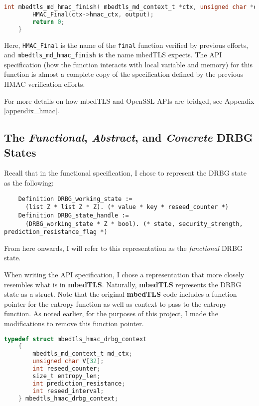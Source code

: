 \documentclass[pageno]{jpaper}
\newcommand{\stdtitle}[1]{\textbf{#1}}
\begin{document}
\begin{lstlisting}[language=C]
    int mbedtls_md_hmac_finish( mbedtls_md_context_t *ctx, unsigned char *output) {
        HMAC_Final(ctx->hmac_ctx, output);
        return 0;
    }
\end{lstlisting}


Here, \lstinline{HMAC_Final} is the name of the \lstinline{final} function verified by previous efforts, and \lstinline{mbedtls_md_hmac_finish} is the name mbedTLS expects. The API specification (how the function interacts with local variable and memory) for this function is almost a complete copy of the specification defined by the previous HMAC verification efforts.

For more details on how mbedTLS and OpenSSL APIs are bridged, see Appendix \ref{appendix_hmac}.


\subsection{The \textit{Functional}, \textit{Abstract}, and \textit{Concrete} DRBG States}

Recall that in the functional specification, I chose to represent the DRBG state as the following:

\begin{lstlisting}
    Definition DRBG_working_state :=
      (list Z * list Z * Z). (* value * key * reseed_counter *)
    Definition DRBG_state_handle :=
      (DRBG_working_state * Z * bool). (* state, security_strength, prediction_resistance_flag *)
\end{lstlisting}


From here onwards, I will refer to this representation as the \textit{functional} DRBG state.

When writing the API specification, I chose a representation that more closely resembles what is in \stdtitle{mbedTLS}. Naturally, \stdtitle{mbedTLS} represents the DRBG state as a struct. Note that the original \stdtitle{mbedTLS} code includes a function pointer for the entropy function as well as context to pass to the entropy function. As noted earlier, for the purposes of this project, I made the modifications to remove this function pointer.

\begin{lstlisting}[language=C]
    typedef struct mbedtls_hmac_drbg_context
    {
        mbedtls_md_context_t md_ctx;
        unsigned char V[32];
        int reseed_counter;
        size_t entropy_len;
        int prediction_resistance;
        int reseed_interval;
    } mbedtls_hmac_drbg_context;
\end{lstlisting}
\end{document}
